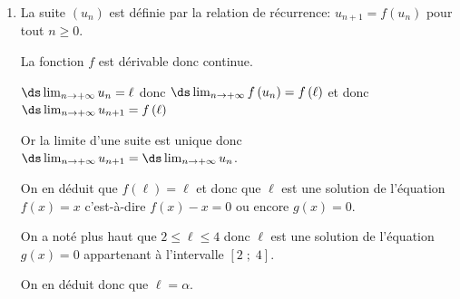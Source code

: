 \begin{enumerate}
Donc, d'après le corollaire du théorème des valeurs intermédiaires, on peut conclure que l'équation $g(x)=0$ admet une solution unique dans l'intervalle $[2\;;\;4]$.

On appelle $\alpha$ cette solution. À la calculatrice on trouve $\alpha\approx 3,78$.


\item
La suite $(u_n)$ est définie par la relation de récurrence: $u_{n+1}=f\left (u_n\right )$ pour tout $n\geqslant 0$.

La fonction $f$ est dérivable donc continue.

$\ds\lim_{n\to +\infty} u_n=\ell$ donc $\ds\lim_{n\to +\infty} f\left (u_n\right )=f\left (\ell\right )$ et donc $\ds\lim_{n\to +\infty} u_{n+1}=f\left (\ell\right )$

Or la limite d'une suite est unique donc $\ds\lim_{n\to +\infty} u_{n+1}= \ds\lim_{n\to +\infty} u_{n}$.

On en déduit que $f\left (\ell\right ) = \ell$ et donc que $\ell$ est une solution de l'équation $f(x)=x$ c'est-à-dire $f(x)-x=0$ ou encore $g(x)=0$.

On a noté plus haut que $2 \leqslant \ell \leqslant 4$ donc $\ell$ est une solution de l'équation $g(x)=0$ appartenant à l'intervalle $[2\;;\;4]$.

On en déduit donc que $\ell=\alpha$.

\end{enumerate}

\bigskip
